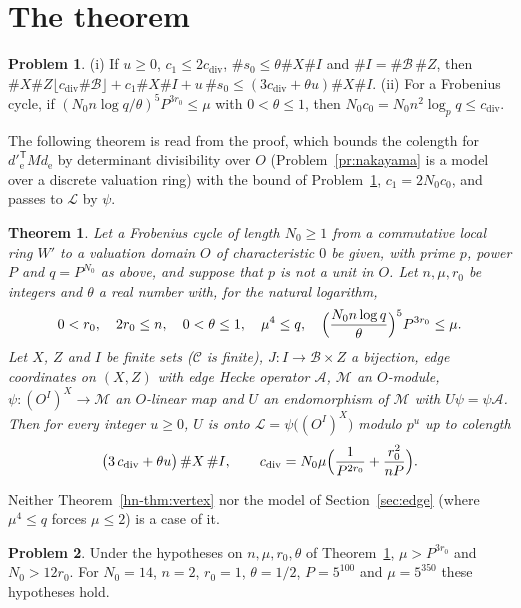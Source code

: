 \documentclass[reqno]{amsart}
\numberwithin{equation}{section}
\theoremstyle{plain}
\newtheorem{theorem}{Theorem}[section]
\theoremstyle{definition}
\newtheorem{problem}{Problem}[section]
\theoremstyle{remark}
\newcommand{\Bc}{\mathcal B}
\newcommand{\Cc}{\mathcal C}
\newcommand{\Ac}{\mathcal A}
\newcommand{\cdiv}{c_{\mathrm{div}}}
\begin{document}
\section{The theorem}\label{sec:theorem}

\begin{problem}\label{pr:costs}
(i) If \(u \ge 0\), \(c_1 \le 2\cdiv\), \(\#s_0 \le \theta\#X\#I\) and \(\#I = \#\Bc\,\#Z\), then \(\#X\#Z\lfloor\cdiv\#\Bc\rfloor + c_1\#X\#I + u\,\#s_0 \le (3\cdiv + \theta u)\#X\#I\).  (ii) For a Frobenius cycle, if \((N_0n\log q/\theta)^5P^{3r_0} \le \mu\) with \(0 < \theta \le 1\), then \(N_0c_0 = N_0n^2\log_p q \le \cdiv\).
\end{problem}

The following theorem is read from the proof, which bounds the colength for \(d'^{\mathsf T}_{\mathrm e}Md_{\mathrm e}\) by determinant divisibility over \(O\) (Problem~\ref{pr:nakayama} is a model over a discrete valuation ring) with the bound of Problem~\ref{pr:costs}, \(c_1 = 2N_0c_0\), and passes to \(\mathcal L\) by \(\psi\).

\begin{theorem}\label{thm:elementary-divisors}
Let a Frobenius cycle of length \(N_0 \ge 1\) from a commutative local ring \(W'\) to a valuation domain \(O\) of characteristic \(0\) be given, with prime \(p\), power \(P\) and \(q = P^{N_0}\) as above, and suppose that \(p\) is not a unit in \(O\).  Let \(n, \mu, r_0\) be integers and \(\theta\) a real number with, for the natural logarithm,
\[
  0 < r_0, \quad 2r_0 \le n, \quad 0 < \theta \le 1, \quad \mu^4 \le q, \quad \Bigl(\frac{N_0 n \log q}{\theta}\Bigr)^5 P^{3r_0} \le \mu .
\]
Let \(X\), \(Z\) and \(I\) be finite sets (\(\Cc\) is finite), \(J \colon I \to \Bc \times Z\) a bijection, edge coordinates on \((X, Z)\) with edge Hecke operator \(\Ac\), \(\mathcal M\) an \(O\)-module, \(\psi \colon (O^I)^X \to \mathcal M\) an \(O\)-linear map and \(U\) an endomorphism of \(\mathcal M\) with \(U \psi = \psi \Ac\).  Then for every integer \(u \ge 0\), \(U\) is onto \(\mathcal L = \psi\bigl((O^I)^X\bigr)\) modulo \(p^u\) up to colength
\[
  \bigl(3\,\cdiv + \theta u\bigr)\, \#X\, \#I, \qquad \cdiv = N_0 \mu \Bigl(\frac{1}{P^{2r_0}} + \frac{r_0^2}{n P}\Bigr) .
\]
\end{theorem}

Neither Theorem~\ref{hn-thm:vertex} nor the model of Section~\ref{sec:edge} (where \(\mu^4 \le q\) forces \(\mu \le 2\)) is a case of it.

\begin{problem}\label{pr:cycle}
Under the hypotheses on \(n, \mu, r_0, \theta\) of Theorem~\ref{thm:elementary-divisors}, \(\mu > P^{3r_0}\) and \(N_0 > 12r_0\).  For \(N_0 = 14\), \(n = 2\), \(r_0 = 1\), \(\theta = 1/2\), \(P = 5^{100}\) and \(\mu = 5^{350}\) these hypotheses hold.
\end{problem}
\end{document}
